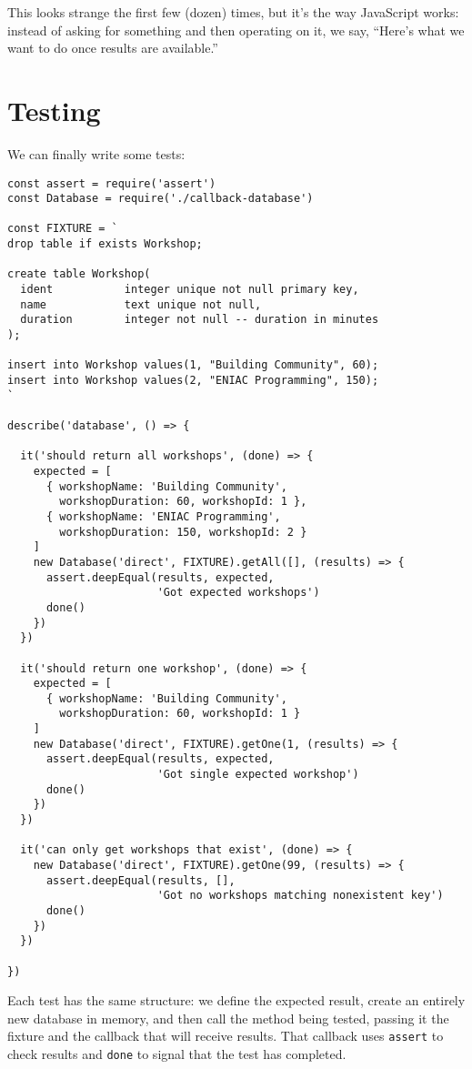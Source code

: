 This looks strange the first few (dozen) times,
but it's the way JavaScript works:
instead of asking for something and then operating on it,
we say,
``Here's what we want to do once results are available.''

\section{Testing}\label{s:db-testing}

We can finally write some tests:

\begin{verbatim}
const assert = require('assert')
const Database = require('./callback-database')

const FIXTURE = `
drop table if exists Workshop;

create table Workshop(
  ident           integer unique not null primary key,
  name            text unique not null,
  duration        integer not null -- duration in minutes
);

insert into Workshop values(1, "Building Community", 60);
insert into Workshop values(2, "ENIAC Programming", 150);
`

describe('database', () => {

  it('should return all workshops', (done) => {
    expected = [
      { workshopName: 'Building Community',
        workshopDuration: 60, workshopId: 1 },
      { workshopName: 'ENIAC Programming',
        workshopDuration: 150, workshopId: 2 }
    ]
    new Database('direct', FIXTURE).getAll([], (results) => {
      assert.deepEqual(results, expected,
                       'Got expected workshops')
      done()
    })
  })

  it('should return one workshop', (done) => {
    expected = [
      { workshopName: 'Building Community',
        workshopDuration: 60, workshopId: 1 }
    ]
    new Database('direct', FIXTURE).getOne(1, (results) => {
      assert.deepEqual(results, expected,
                       'Got single expected workshop')
      done()
    })
  })

  it('can only get workshops that exist', (done) => {
    new Database('direct', FIXTURE).getOne(99, (results) => {
      assert.deepEqual(results, [],
                       'Got no workshops matching nonexistent key')
      done()
    })
  })

})
\end{verbatim}

Each test has the same structure:
we define the expected result,
create an entirely new database in memory,
and then call the method being tested,
passing it the fixture and the callback that will receive results.
That callback uses \texttt{assert} to check results
and \texttt{done} to signal that the test has completed.


